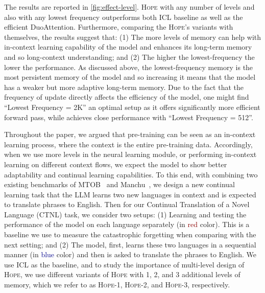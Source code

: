 \documentclass{article}
\newcommand{\citep}{\parencite}
\newcommand{\head}[1]{\vspace{1.7mm}\noindent{{\textcolor{c4}{\bf #1.}}}}
\newcommand{\model}[0]{\textsc{Hope}}
\begin{document}
{The results are reported in \autoref{fig:effect-level}. \model{} with any number of levels and also with any lowest frequency outperforms both ICL baseline as well as the efficient DuoAttention. Furthermore, comparing the \model's variants with themselves, the results suggest that: (1) The more levels of memory can help with in-context learning capability of the model and enhances its long-term memory and so long-context understanding;  and (2) The higher the lowest-frequency the lower the performance. As discussed above, the lowest-frequency memory is the most persistent memory of the model and so increasing it means that the model has a weaker but more adaptive long-term memory. Due to the fact that the frequency of update directly affects the efficiency of the model, one might find ``Lowest Frequency = 2K'' an optimal setup as it offers significantly more efficient forward pass, while achieves close performance with ``Lowest Frequency = 512''. 

\head{Learning a New Language In-Context}
Throughout the paper, we argued that pre-training can be seen as an in-context learning process, where the context is the entire pre-training data. Accordingly, when we use more levels in the neural learning module, or performing in-context learning on different context flows, we expect the model to show better adaptability and continual learning capabilities. To this end, with combining two existing benchmarks of MTOB~\citep{tanzer2024a} and Manchu~\citep{pei2025understanding}, we design a new continual learning task that the LLM learns two new languages in context and is expected to translate phrases to English. 
Then for our Continual Translation of a Novel Language (CTNL) task, we consider two setups: (1) Learning and testing the performance of the model on each language separately (in \textcolor{darkred}{red} color). This is a baseline we use to measure the catastrophic forgetting when comparing with the next setting; and (2) The model, first, learns these two languages in a sequential manner (in \textcolor{darkblue}{blue} color) and then is asked to translate the phrases to English. We use ICL as the baseline, and to study the importance of multi-level design of \model, we use different variants of \model{} with 1, 2, and 3 additional levels of memory, which we refer to as \model-1, \model-2, and \model-3, respectively.

}
\end{document}
